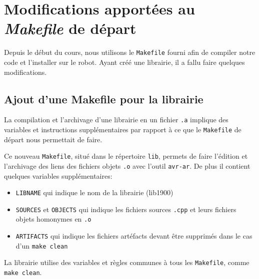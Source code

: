 \documentclass[12pt]{scrartcl}
\begin{document}
\newpage
\section{Modifications apportées au \textit{Makefile} de départ}
Depuis le début du cours, nous utilisons le \texttt{Makefile} fourni afin de
compiler notre code et l'installer sur le robot. Ayant créé une librairie, il a
fallu faire quelques modifications.
\subsection{Ajout d'une Makefile pour la librairie}
La compilation et l'archivage d'une librairie en un fichier \texttt{.a} implique
des variables et instructions supplémentaires par rapport à ce que le
\texttt{Makefile} de départ nous permettait de faire.

Ce nouveau \texttt{Makefile},
situé dans le répertoire \texttt{lib}, permets de faire l'édition et l'archivage
des liens des fichiers objets \texttt{.o} avec l'outil \texttt{avr-ar}. De plus il
contient quelques variables supplémentaires:
\begin{itemize}
    \item \verb|LIBNAME| qui indique le nom de la librairie (lib1900)
    \item \verb|SOURCES| et \verb|OBJECTS| qui indique les fichiers sources \verb|.cpp|
          et leurs fichiers objets homonymes en \verb|.o|
    \item \verb|ARTIFACTS| qui indique les fichiers artéfacts devant être supprimés
          dans le cas d'un \verb|make clean|
\end{itemize}
La librairie utilise des variables et règles communes à tous les \verb|Makefile|,
comme \verb|make clean|.

\end{document}
